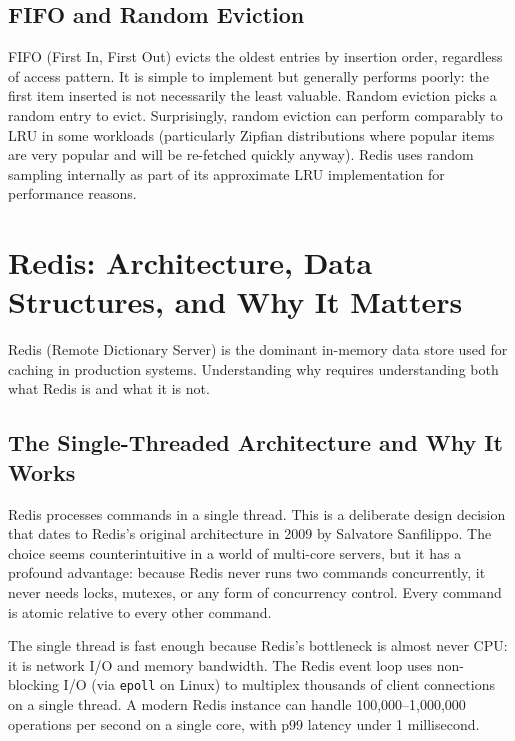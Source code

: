\documentclass[11pt,a4paper]{article}
\begin{document}
\subsection{FIFO and Random Eviction}

FIFO (First In, First Out) evicts the oldest entries by insertion order, regardless of access pattern. It is simple to implement but generally performs poorly: the first item inserted is not necessarily the least valuable. Random eviction picks a random entry to evict. Surprisingly, random eviction can perform comparably to LRU in some workloads (particularly Zipfian distributions where popular items are very popular and will be re-fetched quickly anyway). Redis uses random sampling internally as part of its approximate LRU implementation for performance reasons.

\section{Redis: Architecture, Data Structures, and Why It Matters}

Redis (Remote Dictionary Server) is the dominant in-memory data store used for caching in production systems. Understanding why requires understanding both what Redis is and what it is not.

\subsection{The Single-Threaded Architecture and Why It Works}

Redis processes commands in a single thread. This is a deliberate design decision that dates to Redis's original architecture in 2009 by Salvatore Sanfilippo. The choice seems counterintuitive in a world of multi-core servers, but it has a profound advantage: because Redis never runs two commands concurrently, it never needs locks, mutexes, or any form of concurrency control. Every command is atomic relative to every other command.

The single thread is fast enough because Redis's bottleneck is almost never CPU: it is network I/O and memory bandwidth. The Redis event loop uses non-blocking I/O (via \texttt{epoll} on Linux) to multiplex thousands of client connections on a single thread. A modern Redis instance can handle 100,000--1,000,000 operations per second on a single core, with p99 latency under 1 millisecond.
\end{document}
